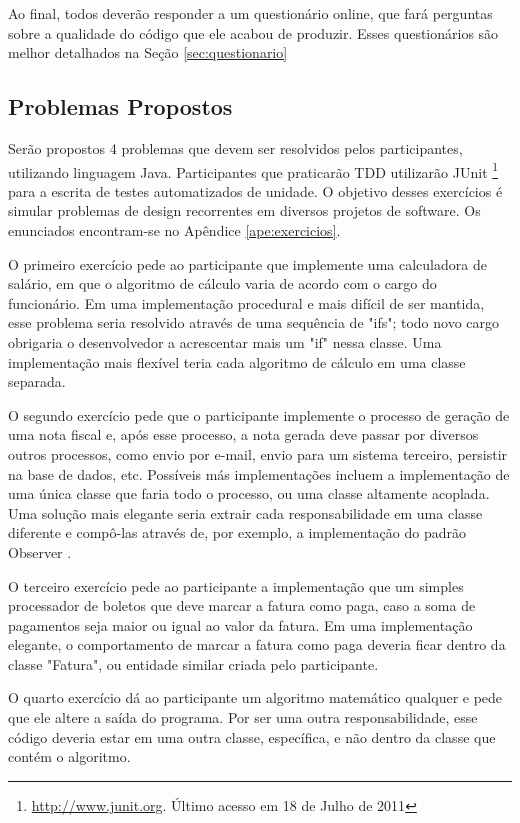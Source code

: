 Ao final, todos deverão responder a um questionário online, que fará perguntas sobre a qualidade
do código que ele acabou de produzir. Esses questionários 
são melhor detalhados na Seção \ref{sec:questionario}

\subsection{Problemas Propostos}
\label{sec:exercicios}

Serão propostos 4 problemas que devem ser resolvidos pelos participantes, utilizando
linguagem Java. Participantes que praticarão TDD utilizarão JUnit \footnote{\url{http://www.junit.org}. 
Último acesso em 18 de Julho de 2011} para a escrita de testes
automatizados de unidade. O objetivo desses exercícios é simular problemas de design 
recorrentes em diversos projetos de software. Os enunciados encontram-se no Apêndice 
\ref{ape:exercicios}.

O primeiro exercício pede ao participante que implemente uma calculadora de salário, em que
o algoritmo de cálculo varia de acordo com o cargo do funcionário. Em uma implementação
procedural e mais difícil de ser mantida, esse problema seria resolvido através de uma
sequência de "ifs"; todo novo cargo obrigaria o desenvolvedor a acrescentar mais um "if" 
nessa classe. Uma implementação mais flexível teria cada algoritmo de cálculo em uma 
classe separada.

O segundo exercício pede que o participante implemente o processo de geração de uma nota fiscal e, após
esse processo, a nota gerada deve passar por diversos outros processos, como envio por e-mail, envio
para um sistema terceiro, persistir na base de dados, etc. Possíveis más implementações incluem a 
implementação de uma única classe que faria todo o processo, ou uma classe altamente acoplada.
Uma solução mais elegante seria extrair cada responsabilidade em uma classe diferente e compô-las
através de, por exemplo, a implementação do padrão Observer \cite{gof}.

O terceiro exercício pede ao participante a implementação que um simples processador de boletos que
deve marcar a fatura como paga, caso a soma de pagamentos seja maior ou igual ao valor da fatura. 
Em uma implementação elegante, o comportamento de marcar a fatura como paga deveria ficar dentro
da classe "Fatura", ou entidade similar criada pelo participante.

O quarto exercício dá ao participante um algoritmo matemático qualquer e pede que ele altere a saída
do programa. Por ser uma outra responsabilidade, esse código deveria estar em uma outra classe, específica,
e não dentro da classe que contém o algoritmo.

